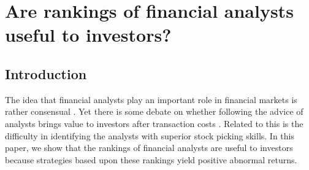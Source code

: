 \documentclass{book}
\begin{document}
% 
% 
% 
% 

\chapter{Are rankings of financial analysts useful to investors?}
\section{Introduction}
\label{sec:intro}

The idea that financial analysts play an important role in financial markets is rather consensual \citep{cowles1933csm,obrien1990}. Yet there is some debate on whether following the advice of analysts brings value to investors after transaction costs \citep{womack1996,mikhail2004sae,li2005persistence}. Related to this is the difficulty in identifying the analysts with superior stock picking skills. In this paper, we show that the rankings of financial analysts are useful to investors because strategies based upon these rankings yield positive abnormal returns.
\end{document}
